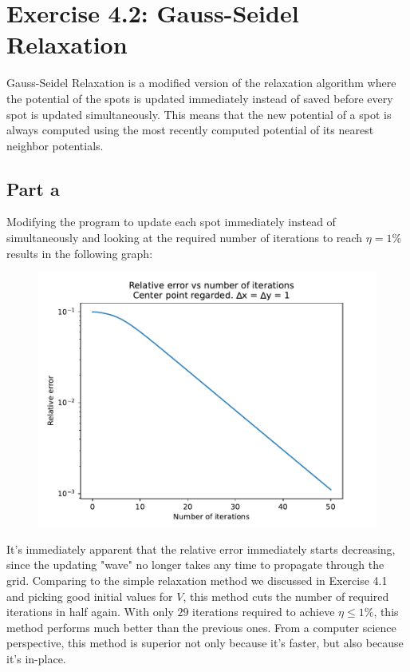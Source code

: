 \documentclass[a4paper,12pt]{article}
\begin{document}
\section*{Exercise 4.2: Gauss-Seidel Relaxation}

Gauss-Seidel Relaxation is a modified version of the relaxation algorithm where the potential of the spots is updated
immediately instead of saved before every spot is updated simultaneously. This means that the new potential of a spot
is always computed using the most recently computed potential of its nearest neighbor potentials.

\subsection*{Part a}

Modifying the program to update each spot immediately instead of simultaneously and looking at the required number
of iterations to reach $\eta = 1\%$ results in the following graph:

\begin{figure}[!ht]
  \centering
  \includegraphics[scale=0.49]{img/4_2a_errorvsn_default.pdf}
\end{figure}

It's immediately apparent that the relative error immediately starts decreasing, since the updating "wave" no longer
takes any time to propagate through the grid. Comparing to the simple relaxation method we discussed in Exercise 4.1
and picking good initial values for $V$, this method cuts the number of required iterations in half again. With only
$29$ iterations required to achieve $\eta \leq 1\%$, this method performs much better than the previous ones. From a
computer science perspective, this method is superior not only because it's faster, but also because it's in-place.
\end{document}

